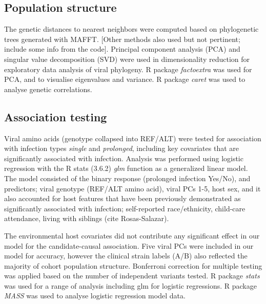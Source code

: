 \documentclass{article} %
\begin{document}
\subsection{Population structure}
The genetic distances to nearest neighbors were computed based on phylogenetic 
trees generated with MAFFT.
[Other methods also used but not pertinent; include some info from the code].
Principal component analysis (PCA) and singular value decomposition (SVD) were used in dimensionality reduction for exploratory data analysis of viral phylogeny.
R package \textit{factoextra} was used for PCA, and to visualise eigenvalues and variance. 
R package \textit{caret} was used to analyse genetic correlations.

\subsection{Association testing}
Viral amino acids (genotype collapsed into REF/ALT) were tested for association with infection types \textit{single} and \textit{prolonged}, 
including key covariates that are significantly associated with infection.
Analysis was performed using logistic regression with the
R stats (3.6.2) \textit{glm} function as a generalized linear model.
The model consisted of the binary response (prolonged infection Yes/No), and predictors; viral genotype (REF/ALT amino acid), viral PCs 1-5, host sex, and it also accounted for host features that have been previously demonstrated as significantly associated with infection; 
self-reported race/ethnicity, child-care attendance, living with siblings (cite Rosas-Salazar).


The environmental host covariates did not contribute any significant effect in our model for the candidate-causal association.
Five viral PCs were included in our model for accuracy, however the clinical 
strain labels (A/B) also reflected the majority of cohort population structure.
Bonferroni correction for multiple testing was applied based on the number of independent variants tested.
R package \textit{stats} was used for a range of analysis including glm for logistic regressions. 
R package \textit{MASS} was used to analyse logistic regression model data.
\end{document}
